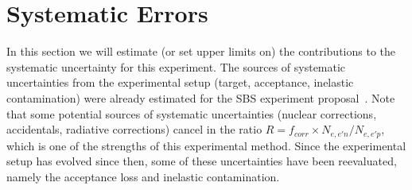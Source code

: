 \section{Systematic Errors}

In this section we will estimate (or set upper limits on) the contributions to the systematic uncertainty for this experiment.
The sources of systematic uncertainties from the experimental setup (target, acceptance, inelastic contamination) were already estimated for the SBS \gmn experiment proposal~\cite{E12-09-019}.
Note that some potential sources of systematic uncertainties (nuclear corrections, accidentals, radiative corrections) cancel in the ratio $R = f_{corr} \times N_{e,e'n}/N_{e,e'p}$, which is one of the strengths of this experimental method.
Since the experimental setup has evolved since then, some of these uncertainties have been reevaluated, namely the acceptance loss and inelastic contamination.

